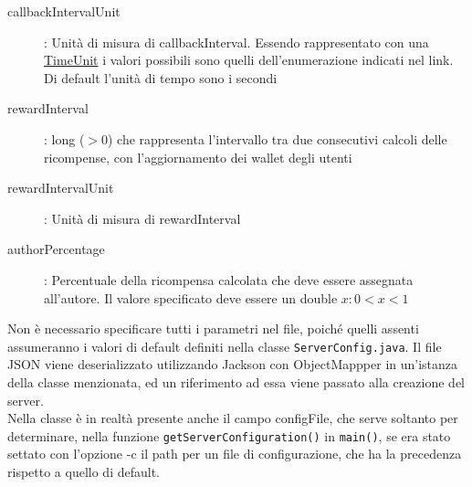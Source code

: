 \begin{description}
	\item[callbackIntervalUnit]: Unità di misura di callbackInterval. Essendo rappresentato con una\\
	\hyperref{https://docs.oracle.com/en/java/javase/11/docs/api/java.base/java/util/concurrent/TimeUnit.html#enum.constant.summary}{category}{name}{TimeUnit} i valori possibili sono quelli dell'enumerazione indicati nel link. Di default l'unità di tempo sono i secondi
	\item[rewardInterval]: long ($>0$) che rappresenta l'intervallo tra due consecutivi calcoli delle ricompense, con l'aggiornamento dei wallet degli utenti
	\item[rewardIntervalUnit]: Unità di misura di rewardInterval
	\item[authorPercentage]: Percentuale della ricompensa calcolata che deve essere assegnata all'autore.
	Il valore specificato deve essere un double $x : 0 < x < 1$
\end{description}

Non è necessario specificare tutti i parametri nel file, poiché quelli assenti assumeranno i valori di default definiti nella classe \verb|ServerConfig.java|. Il file JSON viene deserializzato utilizzando Jackson con ObjectMappper in un'istanza della classe menzionata, ed un riferimento ad essa viene passato alla creazione del server.\\
Nella classe è in realtà presente anche il campo configFile, che serve soltanto per determinare, nella funzione \verb|getServerConfiguration()| in \verb|main()|, se era stato settato con l'opzione -c il path per un file di configurazione, che ha la precedenza rispetto a quello di default.

